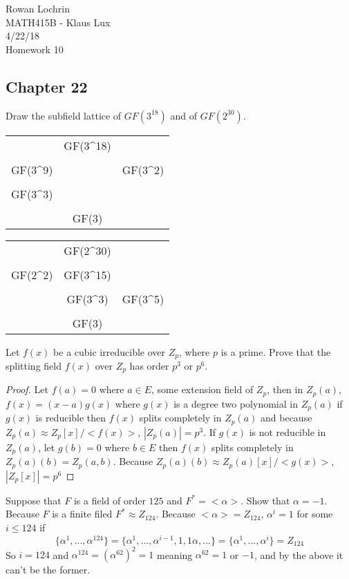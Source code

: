 \documentclass[11pt]{article}
\begin{document}
\begin{flushleft}
Rowan Lochrin \\
MATH415B - Klaus Lux \\
4/22/18 \\
Homework 10 
\end{flushleft}

\begin{description}
\section{Chapter 22}
\item[28] Draw the subfield lattice of $GF(3^{18})$ and of $GF(2^{30})$.
	\begin{center}
		\begin{tabular}{R C L}
			& GF(3^{18}) &\\
			\swarrow& & \searrow\\
			GF(3^9)	& &GF(3^2)\\
			\downarrow & & \downarrow\\
			GF(3^3) & &\downarrow \\
			\searrow & & \swarrow \\
			& GF(3) &\\
		\end{tabular}
		\begin{tabular}{R C L}
			& GF(2^{30}) &\\
			\swarrow&\downarrow & \\
			GF(2^2)	& GF(3^{15}) &\\
			\downarrow &\downarrow & \searrow \\
			\downarrow & GF(3^3) & GF(3^5) \\
			\searrow &\downarrow & \swarrow \\
			& GF(3) &\\
		\end{tabular}
	\end{center}
\item[32]
	Let $f(x)$ be a cubic irreducible over $Z_p$, where $p$ is a prime.
		Prove that the splitting field $f(x)$ over $Z_p$ has order $p^3$
		or $p^6$.
	\begin{proof}
	Let $f(a) = 0$ where $a \in E$, some extension field of $Z_p$, then
		in $Z_p(a)$, $f(x) = (x-a)g(x)$ where $g(x)$ is a degree two
		polynomial in $Z_p(a)$ if $g(x)$ is reducible then $f(x)$ splits
		completely in $Z_p(a)$ and because 
		$Z_p(a) \approx Z_p[x]/<f(x)>$, $|Z_p(a)| = p^3$.
		If $g(x)$ is not reducible in $Z_p(a)$,
		let $g(b) = 0$ where $b \in E$ then $f(x)$
		splits completely in $Z_p(a)(b) = Z_p(a,b)$.
		Because $Z_p(a)(b) \approx Z_p(a)[x]/<g(x)>$,$|Z_p[x]| = p^6$
	\end{proof}
\item[35] 
	Suppose that $F$ is a field of order $125$ and $F^* = <\alpha>$. Show
		that $\alpha = -1$.\\
		Because $F$ is a finite filed $F^* \approx Z_{124}$. Because
		$<\alpha> = Z_{124}$, $\alpha^i = 1$ for some $i\leq 124$ if
		$$\{\alpha^1,...,\alpha^{124}\} = \{\alpha^1, ...,
		\alpha^{i-1}, 1,1\alpha,... \} = \{\alpha^1, ...,\alpha^{i}\} =
		Z_{124}$$
		So $i = 124$ and $\alpha^{124} = (\alpha^{62})^2 = 1$ meaning
		$\alpha^{62} = 1$ or $-1$, and by the above it can't be the
		former.

\end{description}
\end{document}
